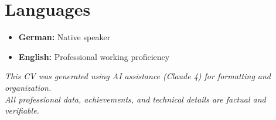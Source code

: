 \documentclass[11pt,a4paper]{article}
\begin{document}
\section{Languages}

\begin{itemize}[leftmargin=*,noitemsep,topsep=0pt]
\item \textbf{German:} Native speaker
\item \textbf{English:} Professional working proficiency
\end{itemize}

\vfill

\begin{center}
\footnotesize\color{secondary}
\textit{This CV was generated using AI assistance (Claude 4) for formatting and organization.\\
All professional data, achievements, and technical details are factual and verifiable.}
\end{center}
\end{document}

